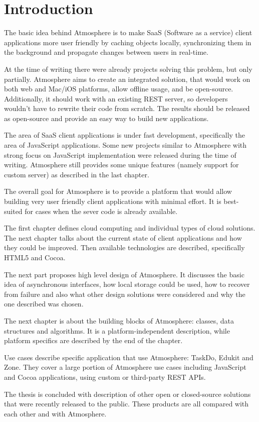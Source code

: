 \setcounter{page}{1}
\setcounter{equation}{0}
\setcounter{figure}{0}
\setcounter{table}{0}

\section*{Introduction}

The basic idea behind Atmosphere is to make SaaS (Software as a service) client applications more user friendly by caching objects locally, synchronizing them in the background and propagate changes between users in real-time.

At the time of writing there were already projects solving this problem, but only partially. Atmosphere aims to create an integrated solution, that would work on both web and Mac/iOS platforms, allow offline usage, and be open-source. Additionally, it should work with an existing REST server, so developers wouldn't have to rewrite their code from scratch. The results should be released as open-source and provide an easy way to build new applications.

The area of SaaS client applications is under fast development, specifically the area of JavaScript applications. Some new projects similar to Atmosphere with strong focus on JavaScript implementation were released during the time of writing. Atmosphere still provides some unique features (namely support for custom server) as described in the last chapter.

The overall goal for Atmosphere is to provide a platform that would allow building very user friendly client applications with minimal effort. It is best-suited for cases when the sever code is already available.

The first chapter defines cloud computing and individual types of cloud solutions. The next chapter talks about the current state of client applications and how they could be improved. Then available technologies are described, specifically HTML5 and Cocoa.

The next part proposes high level design of Atmosphere. It discusses the basic idea of asynchronous interfaces, how local storage could be used, how to recover from failure and also what other design solutions were considered and why the one described was chosen.

The next chapter is about the building blocks of Atmosphere: classes, data structures and algorithms. It is a platform-independent description, while platform specifics are described by the end of the chapter.

Use cases describe specific application that use Atmosphere: TaskDo, Edukit and Zone. They cover a large portion of Atmosphere use cases including JavaScript and Cocoa applications, using custom or third-party REST APIs.

The thesis is concluded with description of other open or closed-source solutions that were recently released to the public. These products are all compared with each other and with Atmosphere. 